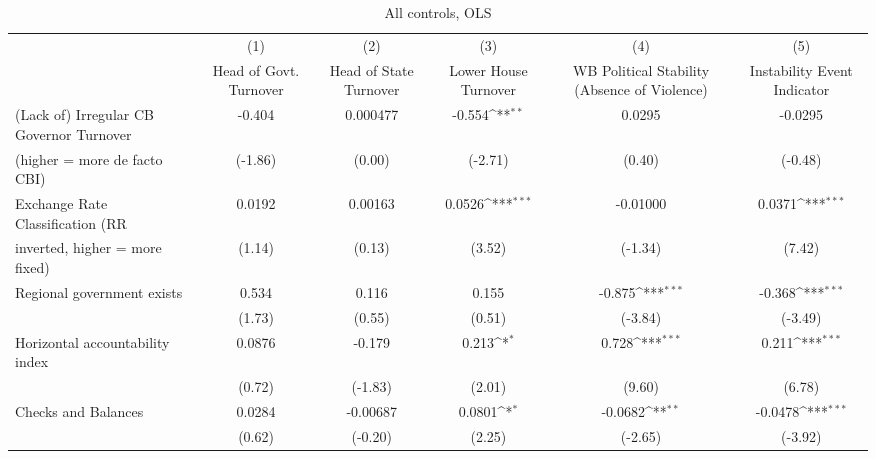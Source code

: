 \begin{table}[htbp]\centering
\def\sym#1{\ifmmode^{#1}\else\(^{#1}\)\fi}
\caption{All controls, OLS \label{fullcmultIndOLSDF}}
\begin{tabular}{l*{5}{c}}
\toprule
                                        &\multicolumn{1}{c}{(1)}&\multicolumn{1}{c}{(2)}&\multicolumn{1}{c}{(3)}&\multicolumn{1}{c}{(4)}&\multicolumn{1}{c}{(5)}\\
                                        &\multicolumn{1}{c}{Head of Govt. Turnover}&\multicolumn{1}{c}{Head of State Turnover}&\multicolumn{1}{c}{Lower House Turnover}&\multicolumn{1}{c}{WB Political Stability (Absence of Violence)}&\multicolumn{1}{c}{Instability Event Indicator}\\
\midrule
(Lack of) Irregular CB Governor Turnover&   -0.404         & 0.000477         &   -0.554\sym{**} &   0.0295         &  -0.0295         \\
(higher = more de facto CBI)            &  (-1.86)         &   (0.00)         &  (-2.71)         &   (0.40)         &  (-0.48)         \\
\addlinespace
Exchange Rate Classification (RR        &   0.0192         &  0.00163         &   0.0526\sym{***}& -0.01000         &   0.0371\sym{***}\\
inverted, higher = more fixed)          &   (1.14)         &   (0.13)         &   (3.52)         &  (-1.34)         &   (7.42)         \\
\addlinespace
Regional government exists              &    0.534         &    0.116         &    0.155         &   -0.875\sym{***}&   -0.368\sym{***}\\
                                        &   (1.73)         &   (0.55)         &   (0.51)         &  (-3.84)         &  (-3.49)         \\
\addlinespace
Horizontal accountability index         &   0.0876         &   -0.179         &    0.213\sym{*}  &    0.728\sym{***}&    0.211\sym{***}\\
                                        &   (0.72)         &  (-1.83)         &   (2.01)         &   (9.60)         &   (6.78)         \\
\addlinespace
Checks and Balances                     &   0.0284         & -0.00687         &   0.0801\sym{*}  &  -0.0682\sym{**} &  -0.0478\sym{***}\\
                                        &   (0.62)         &  (-0.20)         &   (2.25)         &  (-2.65)         &  (-3.92)         \\

\end{tabular}
\end{table}
